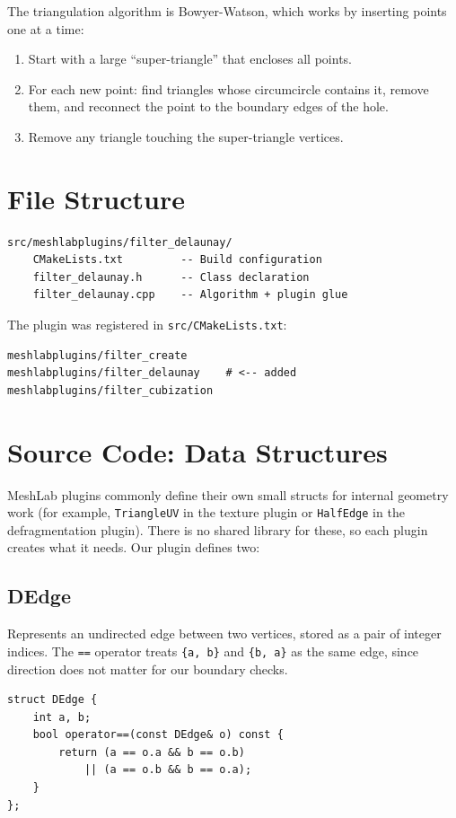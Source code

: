 \documentclass[12pt]{extreport}
\begin{document}
The triangulation algorithm is Bowyer-Watson, which works by inserting points one at a time:
\begin{enumerate}
    \item Start with a large ``super-triangle'' that encloses all points.
    \item For each new point: find triangles whose circumcircle contains it, remove them, and reconnect the point to the boundary edges of the hole.
    \item Remove any triangle touching the super-triangle vertices.
\end{enumerate}

\section{File Structure}
\begin{verbatim}
src/meshlabplugins/filter_delaunay/
    CMakeLists.txt         -- Build configuration
    filter_delaunay.h      -- Class declaration
    filter_delaunay.cpp    -- Algorithm + plugin glue
\end{verbatim}

The plugin was registered in \texttt{src/CMakeLists.txt}:
\begin{lstlisting}[style=bashstyle]
meshlabplugins/filter_create
meshlabplugins/filter_delaunay    # <-- added
meshlabplugins/filter_cubization
\end{lstlisting}

\section{Source Code: Data Structures}

MeshLab plugins commonly define their own small structs for internal geometry work (for example, \texttt{TriangleUV} in the texture plugin or \texttt{HalfEdge} in the defragmentation plugin). There is no shared library for these, so each plugin creates what it needs. Our plugin defines two:

\subsection{DEdge}
Represents an undirected edge between two vertices, stored as a pair of integer indices. The \texttt{==} operator treats \texttt{\{a, b\}} and \texttt{\{b, a\}} as the same edge, since direction does not matter for our boundary checks.

\begin{lstlisting}[style=cppstyle]
struct DEdge {
    int a, b;
    bool operator==(const DEdge& o) const {
        return (a == o.a && b == o.b)
            || (a == o.b && b == o.a);
    }
};
\end{lstlisting}
\end{document}
